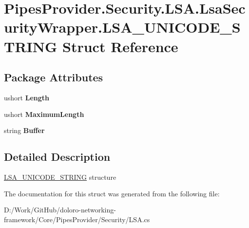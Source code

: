 \hypertarget{struct_pipes_provider_1_1_security_1_1_l_s_a_1_1_lsa_security_wrapper_1_1_l_s_a___u_n_i_c_o_d_e___s_t_r_i_n_g}{}\section{Pipes\+Provider.\+Security.\+L\+S\+A.\+Lsa\+Security\+Wrapper.\+L\+S\+A\+\_\+\+U\+N\+I\+C\+O\+D\+E\+\_\+\+S\+T\+R\+I\+NG Struct Reference}
\label{struct_pipes_provider_1_1_security_1_1_l_s_a_1_1_lsa_security_wrapper_1_1_l_s_a___u_n_i_c_o_d_e___s_t_r_i_n_g}
\subsection*{Package Attributes}
\begin{DoxyCompactItemize}
\item 
\mbox{\label{struct_pipes_provider_1_1_security_1_1_l_s_a_1_1_lsa_security_wrapper_1_1_l_s_a___u_n_i_c_o_d_e___s_t_r_i_n_g_a48ff19f0bbc21f97b2eeb426cc5c3514}} 
ushort {\bfseries Length}
\item 
\mbox{\label{struct_pipes_provider_1_1_security_1_1_l_s_a_1_1_lsa_security_wrapper_1_1_l_s_a___u_n_i_c_o_d_e___s_t_r_i_n_g_a9722e45e60277e9b0b28049783af0ed8}} 
ushort {\bfseries Maximum\+Length}
\item 
\mbox{\label{struct_pipes_provider_1_1_security_1_1_l_s_a_1_1_lsa_security_wrapper_1_1_l_s_a___u_n_i_c_o_d_e___s_t_r_i_n_g_a334675cf58725b2410e377674069dbf0}} 
string {\bfseries Buffer}
\end{DoxyCompactItemize}


\subsection{Detailed Description}
\mbox{\hyperlink{struct_pipes_provider_1_1_security_1_1_l_s_a_1_1_lsa_security_wrapper_1_1_l_s_a___u_n_i_c_o_d_e___s_t_r_i_n_g}{L\+S\+A\+\_\+\+U\+N\+I\+C\+O\+D\+E\+\_\+\+S\+T\+R\+I\+NG}} structure 

The documentation for this struct was generated from the following file\+:\begin{DoxyCompactItemize}
\item 
D\+:/\+Work/\+Git\+Hub/doloro-\/networking-\/framework/\+Core/\+Pipes\+Provider/\+Security/L\+S\+A.\+cs\end{DoxyCompactItemize}
